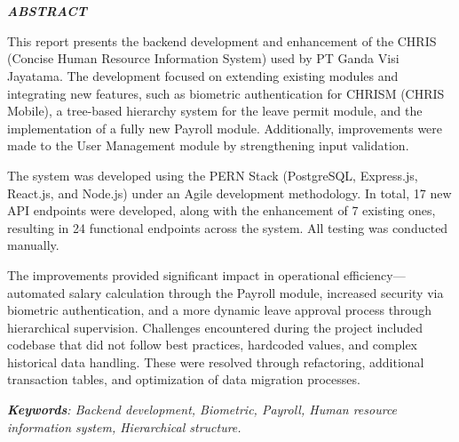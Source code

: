 \chapter*{\MakeUppercase{\textit{\judulInggris}}}
\singlespacing
\begin{center}
    
    \vspace{-4em}
    
    \penulis
    
	\bigskip
    
    \textit{\textbf{ABSTRACT}}
    
\end{center}


\vspace*{0.2cm}
{
	\setlength{\parindent}{0pt}

	\bigskip
	\bigskip


	This report presents the backend development and enhancement of the CHRIS (Concise Human Resource Information System) used by PT Ganda Visi Jayatama. The development focused on extending existing modules and integrating new features, such as biometric authentication for CHRISM (CHRIS Mobile), a tree-based hierarchy system for the leave permit module, and the implementation of a fully new Payroll module. Additionally, improvements were made to the User Management module by strengthening input validation.

	The system was developed using the PERN Stack (PostgreSQL, Express.js, React.js, and Node.js) under an Agile development methodology. In total, 17 new API endpoints were developed, along with the enhancement of 7 existing ones, resulting in 24 functional endpoints across the system. All testing was conducted manually.

	The improvements provided significant impact in operational efficiency—automated salary calculation through the Payroll module, increased security via biometric authentication, and a more dynamic leave approval process through hierarchical supervision. Challenges encountered during the project included codebase that did not follow best practices, hardcoded values, and complex historical data handling. These were resolved through refactoring, additional transaction tables, and optimization of data migration processes.
	
	\bigskip
 
	\textit{\textbf{Keywords}: Backend development, Biometric, Payroll, Human resource information system, Hierarchical structure.}	
}

\onehalfspacing